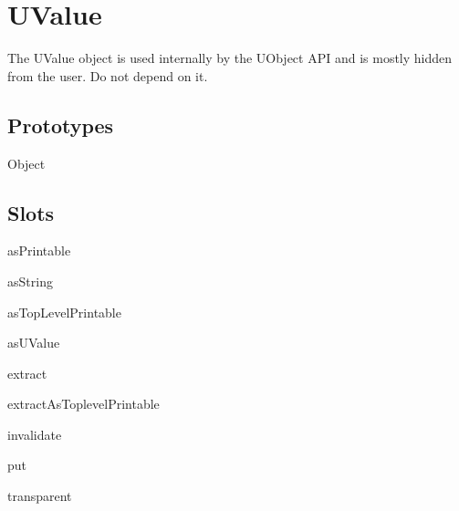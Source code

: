 
\section{UValue}


The UValue object is used internally by the UObject API and is mostly
hidden from the user.  Do not depend on it.


\subsection{Prototypes}

\begin{refObjects}
\item[Object]
\end{refObjects}

\subsection{Slots}

\begin{urbiscriptapi}
\item[asPrintable]
\item[asString]
\item[asTopLevelPrintable]
\item[asUValue]
\item[extract]
\item[extractAsToplevelPrintable]
\item[invalidate]
\item[put]
\item[transparent]
\end{urbiscriptapi}

